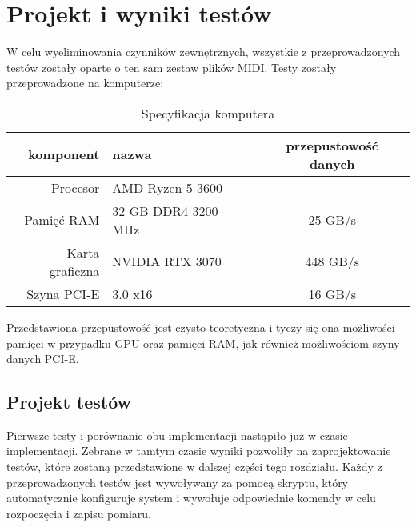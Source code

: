 \chapter{Projekt i wyniki testów}

W celu wyeliminowania czynników zewnętrznych, wszystkie z przeprowadzonych testów zostały oparte o ten sam zestaw plików MIDI. Testy zostały przeprowadzone na komputerze:

\begin{table}[H]
    \begin{center}
        \caption{Specyfikacja komputera}
        \label{tab:Specyfikacja komputera}
        \begin{tabular}{r l c}
            \hline
            \textbf{komponent} & \textbf{nazwa} & \textbf{przepustowość danych} \\
            \hline
            Procesor & AMD Ryzen 5 3600 & - \\
            \hline
            Pamięć RAM & 32 GB DDR4 3200 MHz & 25 GB/s \\
            \hline
            Karta graficzna & NVIDIA RTX 3070 & 448 GB/s \\
            \hline
            Szyna PCI-E & 3.0 x16 & 16 GB/s \\
            \hline
        \end{tabular}
    \end{center}
\end{table}

Przedstawiona przepustowość jest czysto teoretyczna i tyczy się ona możliwości pamięci w przypadku GPU oraz pamięci RAM, jak również możliwościom szyny danych PCI-E.

\section{Projekt testów}

Pierwsze testy i porównanie obu implementacji nastąpiło już w czasie implementacji. Zebrane w tamtym czasie wyniki pozwoliły na zaprojektowanie testów, które zostaną przedstawione w dalszej części tego rozdziału. Każdy z przeprowadzonych testów jest wywoływany za pomocą skryptu, który automatycznie konfiguruje system i wywołuje odpowiednie komendy w celu rozpoczęcia i zapisu pomiaru.

